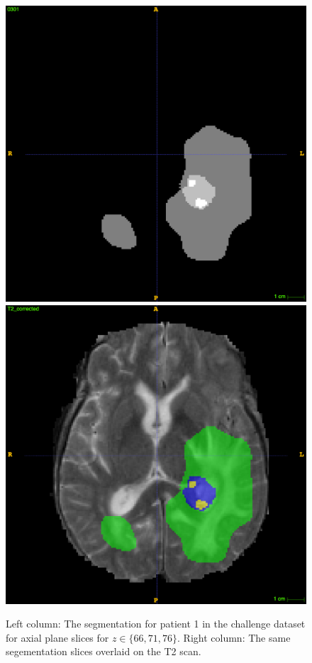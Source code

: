 \documentclass[12pt,a4paper,twoside,openright]{report}
\begin{document}
\begin{figure}
	\\
	\vspace{0.5cm}
	\includegraphics[scale = 0.1]{challenge_1_segmentation_76}
	\includegraphics[scale = 0.1]{challenge_1_segmentation_with_T2_76}
	
	\caption[Example segmentation computed using the model proposed by Pereira et al.]{Left column: The segmentation for patient 1 in the challenge dataset for axial plane slices for $z \in \{66, 71, 76\}$. Right column: The same segementation slices overlaid on the T2 scan.}
	\label{fig:example_pereira_segmentation}
\end{figure}
\end{document}
